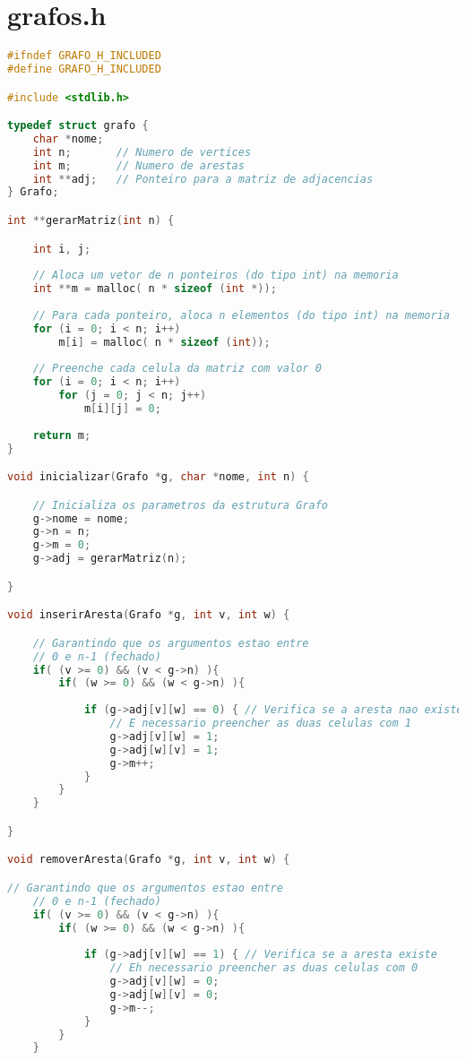 \documentclass[12pt,a4paper,oneside]{article}
\begin{document}
\newpage

\section{grafos.h}

\begin{lstlisting}[language=C]
#ifndef GRAFO_H_INCLUDED
#define GRAFO_H_INCLUDED

#include <stdlib.h>

typedef struct grafo {
	char *nome;
	int n;       // Numero de vertices
	int m;       // Numero de arestas
	int **adj;   // Ponteiro para a matriz de adjacencias
} Grafo;

int **gerarMatriz(int n) {

	int i, j;
	
	// Aloca um vetor de n ponteiros (do tipo int) na memoria
	int **m = malloc( n * sizeof (int *));
	
	// Para cada ponteiro, aloca n elementos (do tipo int) na memoria
	for (i = 0; i < n; i++)
		m[i] = malloc( n * sizeof (int));
	
	// Preenche cada celula da matriz com valor 0
	for (i = 0; i < n; i++)
		for (j = 0; j < n; j++)
			m[i][j] = 0;
	
	return m;
}

void inicializar(Grafo *g, char *nome, int n) {

	// Inicializa os parametros da estrutura Grafo
	g->nome = nome;
	g->n = n;
	g->m = 0;
	g->adj = gerarMatriz(n);

}

void inserirAresta(Grafo *g, int v, int w) {

	// Garantindo que os argumentos estao entre
	// 0 e n-1 (fechado)
	if( (v >= 0) && (v < g->n) ){
		if( (w >= 0) && (w < g->n) ){
		
			if (g->adj[v][w] == 0) { // Verifica se a aresta nao existe
				// E necessario preencher as duas celulas com 1
				g->adj[v][w] = 1;
				g->adj[w][v] = 1;
				g->m++;
			}
		}
	}

}

void removerAresta(Grafo *g, int v, int w) {

// Garantindo que os argumentos estao entre
	// 0 e n-1 (fechado)
	if( (v >= 0) && (v < g->n) ){
		if( (w >= 0) && (w < g->n) ){
		
			if (g->adj[v][w] == 1) { // Verifica se a aresta existe
				// Eh necessario preencher as duas celulas com 0
				g->adj[v][w] = 0;
				g->adj[w][v] = 0;
				g->m--;
			}
		}
	}


\end{lstlisting}
\end{document}
